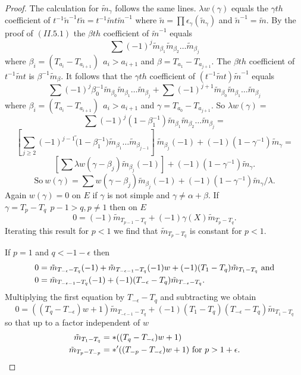 \documentclass{memo-l}
\theoremstyle{definition}
\theoremstyle{remark}
\numberwithin{section}{chapter}
\numberwithin{equation}{chapter}
\begin{document}
\begin{proof}
   The calculation for $\tilde m_{{\gamma}}$ follows the same lines.
${\lambda}w({\gamma})$ equals the ${\gamma}th$ coefficient of 
$t^{-1}\tilde n^{-1}t\tilde n  =  t^{-1}\tilde m t\tilde m^{-1}$ where 
$\tilde n  = \prod {\epsilon}_{{\gamma}}(\tilde n_{{\gamma}})$ and 
$\tilde n^{-1}  =  \tilde m.$ By the proof of $(II.5.1)$
the ${\beta}th$ coefficient of $\tilde m^{-1}$ equals
$$
\sum(-1)^{j}\tilde m_{{\beta}_{1}} \tilde m_{{\beta}_{2}}
\ldots \tilde m_{{\beta}_{j}}
$$
where ${\beta}_{i}  =  (T_{a_{i}} -T_{a_{i+1}})\ \  a_{i} > a_{i+1}$
and ${\beta} = T_{a_{1}} -T_{a_{j+1}}.$ The ${\beta}th$
coefficient of $t^{-1}\tilde m t$ is ${\beta}^{-1}\tilde m_{{\beta}}$.  It
follows that the ${\gamma}th$ coefficient of 
$(t^{-1}\tilde m t)\tilde m^{-1}$ equals
$$
\sum(-1)^{j}{\beta}_{0}^{-1}\tilde m_{{\beta}_{0}} 
\tilde m_{{\beta}_{1}} \ldots \tilde m_{{\beta}_{j}} +
\sum(-1)^{j+1}\tilde m_{{\beta}_{0}} \tilde m_{{\beta}_{1}}
\ldots \tilde m_{{\beta}_{j}}
$$
where ${\beta}_{i}  =  (T_{a_{i}} -T_{a_{i+1}})\ \  a_{i} > a_{i+1}$
and ${\gamma} = T_{a_{0}} -T_{a_{j+1}}.$ So
${\lambda}w({\gamma})  = $
$$
\sum(-1)^{j}(1-{\beta}_{1}^{-1})\tilde m_{{\beta}_{1}} 
\tilde m_{{\beta}_{2}} \ldots \tilde m_{{\beta}_{j}}  = 
$$
$$
[\sum_{j \ge  2} (-1)^{j-1}\tilde (1-\beta_1^{-1})
\tilde m_{{\beta}_{1}} \ldots \tilde m_{{\beta}_{j-1}}]\
\tilde m_{{\beta}_{j}} (-1) + (-1)(1-{\gamma}^{-1})\tilde m_{{\gamma}}  = 
$$
$$
[\sum{\lambda}w({\gamma}-{\beta}_{j})\tilde m_{{\beta}_{j}} (-1)] +
(-1)(1-{\gamma}^{-1})\tilde m_{{\gamma}}.
$$
$$
{\text{So}}\  w({\gamma})  = \sum w({\gamma}-{\beta}_{j})
\tilde m_{{\beta}_{j}}(-1) + (-1)(1-{\gamma}^{-1})\tilde m_{{\gamma}}/{\lambda}.
$$
Again $w({\gamma})  =  0$ on $E$ if ${\gamma}$ is not simple and ${\gamma} \ne 
{\alpha}+{\beta}$.  If ${\gamma}  =  T_{p}-T_{q} \ \ p-1>q, p \ne  1$ then on $E$
$$
0  =  (-1)\tilde m_{T_{p-1}-T_{q}} + (-1){\gamma}(X)\tilde m_{T_{p}-T_{q}}.
$$ 
Iterating this result for $p < 1$ we find that $\tilde m_{T_{p}-T_{q}}$ 
is constant for $p < 1$.

   If $p = 1$ and $q < -1-{\epsilon}$ then 
$$
\aligned
0  &= \tilde m_{T_{-{\epsilon}}-T_{q}}(-1) + 
\tilde m_{T_{-{\epsilon}-1}-T_{q}}(-1)w + 
(-1)(T_{1}-T_{q})\tilde m_{T_{1}-T_{q}}\ {\text{and}} \\
0  &=  \tilde m_{T_{-{\epsilon}-1}-T_{q}} (-1) +
(-1)(T_{-{\epsilon}}-T_{q})\tilde m_{T_{-{\epsilon}}-T_{q}}.
\endaligned
$$
Multiplying the first equation by $T_{-{\epsilon}}-T_{q}$ and subtracting
we obtain
$$
0 =  ((T_{q}-T_{-{\epsilon}})w+1)\tilde m_{T_{-{\epsilon}-1}-T_{q}}
+ (-1)(T_{1}-T_{q})(T_{-{\epsilon}}-T_{q})\tilde m_{T_{1}-T_{q}}
$$
so that up to a factor independent of $w$
$$
\aligned
\tilde m_{T_{1}-T_{q}} &=  *((T_{q}-T_{-{\epsilon}})w+1) \\
\tilde m_{T_{p}-T_{-p}} &=  *'((T_{-p}-T_{-{\epsilon}})w+1)\ {\text{for}}\
p > 1 + {\epsilon}.
\endaligned
$$


\end{proof}
\end{document}
